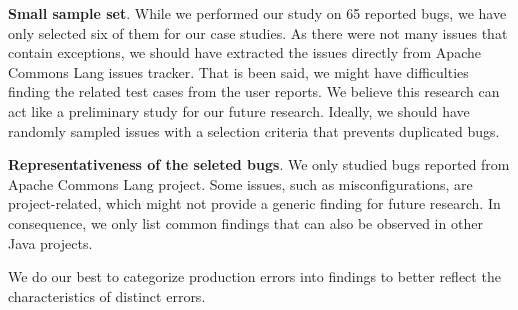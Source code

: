 		\textbf{Small sample set}. While we performed our study on 65 reported bugs, we have only selected six of them for our case studies. As there were not many issues that contain exceptions, we should have extracted the issues directly from Apache Commons Lang issues tracker. That is been said, we might have difficulties finding the related test cases from the user reports. We believe this research can act like a preliminary study for our future research. Ideally, we should have randomly sampled issues with a selection criteria that prevents duplicated bugs.

		\textbf{Representativeness of the seleted bugs}. We only studied bugs reported from Apache Commons Lang project. Some issues, such as misconfigurations, are project-related, which might not provide a generic finding for future research. In consequence, we only list common findings that can also be observed in other Java projects. 

		We do our best to categorize production errors into findings to better reflect the characteristics of distinct errors. 
	~\\